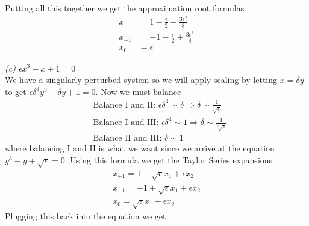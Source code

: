 \documentclass[12pt]{article}
\theoremstyle{remark}
\begin{document}
Putting all this together we get the approximation root formulas
\begin{align*}
	x_{+1} & = 1 - \frac{\epsilon}{2} - \frac{3\epsilon^2}{8} \nonumber \\
	x_{-1} & = -1 - \frac{\epsilon}{2} + \frac{3\epsilon^2}{8} \nonumber \\
	x_0 & = \epsilon \nonumber 
\end{align*}

\newpage

\textit{(c) $\epsilon x^3 - x + 1= 0$} \\ 

We have a singularly perturbed system so we will apply scaling by letting $x = \delta y$ to get $\epsilon\delta^3y^3 - \delta y + 1 = 0$. Now we must balance
\begin{align*}
	& \text{Balance I and II}: \, \epsilon\delta^3 \sim \delta \Rightarrow \delta \sim \frac{1}{\sqrt{\epsilon}} \\	
	& \text{Balance I and III}: \, \epsilon\delta^3 \sim 1 \Rightarrow \delta \sim \frac{1}{\sqrt[3]{\epsilon}} \\
	& \text{Balance II and III}: \, \delta \sim 1
\end{align*}
where balancing I and II is what we want since we arrive at the equation $y^3 - y + \sqrt{\epsilon} = 0$. Using this formula we get the Taylor Series expansions
\begin{align*}
x_{+1} = 1 + \sqrt{\epsilon}x_1 + \epsilon x_2 \\
x_{-1} = -1 + \sqrt{\epsilon}x_1 + \epsilon x_2 \\
x_0 = \sqrt{\epsilon}x_1 + \epsilon x_2
\end{align*}
Plugging this back into the equation we get
\end{document}
